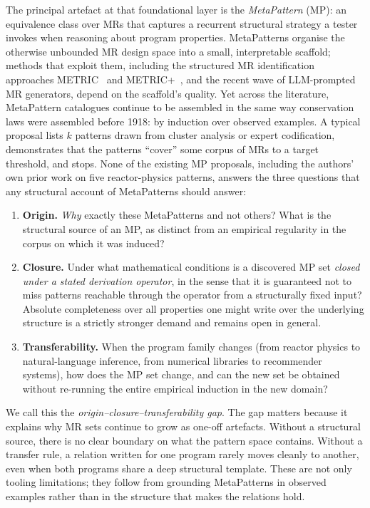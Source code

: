 \documentclass[manuscript]{acmart}
\begin{document}
The principal artefact at that foundational layer is the \emph{MetaPattern} (MP): an equivalence class over MRs that captures a recurrent structural strategy a tester invokes when reasoning about program properties. MetaPatterns organise the otherwise unbounded MR design space into a small, interpretable scaffold; methods that exploit them, including the structured MR identification approaches METRIC~\cite{ChenMETRIC2016} and METRIC+~\cite{SunMETRICplus2021}, and the recent wave of LLM-prompted MR generators, depend on the scaffold's quality. Yet across the literature, MetaPattern catalogues continue to be assembled in the same way conservation laws were assembled before 1918: by induction over observed examples. A typical proposal lists $k$ patterns drawn from cluster analysis or expert codification, demonstrates that the patterns ``cover'' some corpus of MRs to a target threshold, and stops. None of the existing MP proposals, including the authors' own prior work on five reactor-physics patterns, answers the three questions that any structural account of MetaPatterns should answer:

\begin{enumerate}
  \item \textbf{Origin.} \emph{Why} exactly these MetaPatterns and not others? What is the structural source of an MP, as distinct from an empirical regularity in the corpus on which it was induced?
  \item \textbf{Closure.} Under what mathematical conditions is a discovered MP set \emph{closed under a stated derivation operator}, in the sense that it is guaranteed not to miss patterns reachable through the operator from a structurally fixed input? Absolute completeness over all properties one might write over the underlying structure is a strictly stronger demand and remains open in general.
  \item \textbf{Transferability.} When the program family changes (from reactor physics to natural-language inference, from numerical libraries to recommender systems), how does the MP set change, and can the new set be obtained without re-running the entire empirical induction in the new domain?
\end{enumerate}

We call this the \emph{origin--closure--transferability gap}. The gap matters because it explains why MR sets continue to grow as one-off artefacts. Without a structural source, there is no clear boundary on what the pattern space contains. Without a transfer rule, a relation written for one program rarely moves cleanly to another, even when both programs share a deep structural template. These are not only tooling limitations; they follow from grounding MetaPatterns in observed examples rather than in the structure that makes the relations hold.
\end{document}

